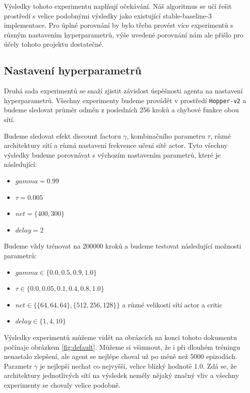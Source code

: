 Výsledky tohoto experimentu naplňují očekávání. Náš algoritmus se učí řešit prostředí s velice podobnými výsledky jako existující stable-baseline-3 implementace. Pro úplné porovnání by bylo třeba provést více experimentů s různým nastavením hyperparametrů, výše uvedené porovnání nám ale přišlo pro účely tohoto projektu dostatečné.

\subsection{Nastavení hyperparametrů}
    Druhá sada experimentů se snaží zjistit závislost úspěšnosti agenta na nastavení hyperparametrů. Všechny experimenty budeme provádět v prostředí \texttt{Hopper-v2} a budeme sledovat průměr odměn z posledních 256 kroků a chybové funkce obou sítí.
    
    Budeme sledovat efekt discount factoru $\gamma$, kombinačního parametru $\tau$, různé architektury sítí a různá nastavení frekvence učení sítě actor. Tyto všechny výsledky budeme porovnávat s výchozím nastavením parametrů, které je následující:
    
    \begin{itemize}
        \item $gamma = 0.99$
        \item $\tau = 0.005$
        \item $net = \{400, 300\}$
        \item $delay = 2$
    \end{itemize}
    
    Budeme vždy trénovat na 200000 kroků a budeme testovat následující možnosti parametrů:
    
    \begin{itemize}
        \item $gamma \in \{0.0, 0.5, 0.9, 1.0\}$
        \item $\tau \in \{0.0, 0.05, 0.1, 0.4, 0.8, 1.0\}$
        \item $net \in \{\{64, 64, 64\}, \{512, 256, 128\}\}$ a různé velikosti sítí actor a critic
        \item $delay \in \{1, 4, 10\}$
    \end{itemize}
    
    Výsledky experimentů můžeme vidět na obrázcích na konci tohoto dokumentu počínaje obrázkem \ref{fig:default}. Můžeme si všimnout, že i při dlouhém tréningu nenastalo zlepšení, ale agent se nejlépe choval už po méně než 5000 epizodách. Parametr $\gamma$ je nejlepší nechat co nejvyšší, velice blízký hodnotě $1.0$. Zdá se, že architektury jednotlivých sítí na výsledek neměly nějaký značný vliv a všechny experimenty se chovaly velice podobně.
    
